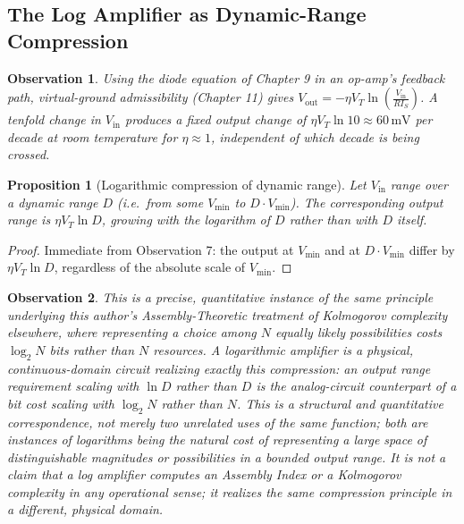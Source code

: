 \documentclass[12pt]{article}
\newtheorem{proposition}{Proposition}
\newtheorem{observation}{Observation}
\begin{document}
\subsection{The Log Amplifier as Dynamic-Range Compression}

\begin{observation}
Using the diode equation of Chapter 9 in an op-amp's feedback path, virtual-ground admissibility (Chapter 11) gives $V_{\text{out}} = -\eta V_T \ln\!\left(\frac{V_{\text{in}}}{RI_S}\right)$. A tenfold change in $V_{\text{in}}$ produces a fixed output change of $\eta V_T\ln 10 \approx 60\,\text{mV}$ per decade at room temperature for $\eta \approx 1$, independent of which decade is being crossed.
\end{observation}

\begin{proposition}[Logarithmic compression of dynamic range]
Let $V_{\text{in}}$ range over a dynamic range $D$ (i.e.\ from some $V_{\min}$ to $D\cdot V_{\min}$). The corresponding output range is $\eta V_T \ln D$, growing with the logarithm of $D$ rather than with $D$ itself.
\end{proposition}

\begin{proof}
Immediate from Observation 7: the output at $V_{\min}$ and at $D\cdot V_{\min}$ differ by $\eta V_T\ln D$, regardless of the absolute scale of $V_{\min}$.
\end{proof}

\begin{observation}
This is a precise, quantitative instance of the same principle underlying this author's Assembly-Theoretic treatment of Kolmogorov complexity elsewhere, where representing a choice among $N$ equally likely possibilities costs $\log_2 N$ bits rather than $N$ resources. A logarithmic amplifier is a physical, continuous-domain circuit realizing exactly this compression: an output range requirement scaling with $\ln D$ rather than $D$ is the analog-circuit counterpart of a bit cost scaling with $\log_2 N$ rather than $N$. This is a structural and quantitative correspondence, not merely two unrelated uses of the same function; both are instances of logarithms being the natural cost of representing a large space of distinguishable magnitudes or possibilities in a bounded output range. It is not a claim that a log amplifier computes an Assembly Index or a Kolmogorov complexity in any operational sense; it realizes the same compression principle in a different, physical domain.
\end{observation}
\end{document}
